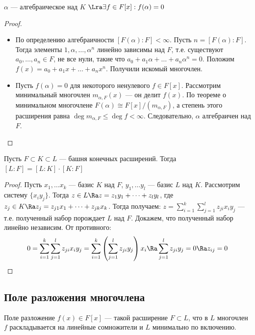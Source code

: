 
\begin{corollary}
    \(\alpha\) --- алгебраическое над \(K\) \(\Lra \exists f \in F[x]: f(\alpha) = 0\)
\end{corollary}
\begin{proof}
    \begin{itemize}
        \item[\(\Ra\)] По определению алгебраичности \([F(\alpha):F] < \infty\). Пусть \(n = [F(\alpha):F]\). Тогда элементы \(1, \alpha, \dots, \alpha^n\) линейно зависимы над \(F\), т.е. существуют \(a_0, \dots, a_n \in F\), не все нули, такие что \(a_0 + a_1\alpha + \dots + a_n\alpha^n = 0\). Положим \(f(x) = a_0 + a_1x + \dots + a_nx^n\). Получили искомый многочлен.
        \item[\(\La\)] Пусть \(f(\alpha) = 0\) для некоторого ненулевого \(f \in F[x]\). Рассмотрим минимальный многочлен \(m_{\alpha,F}(x)\) --- он делит \(f(x)\). По теореме о минимальном многочлене \(F(\alpha) \cong F[x]/(m_{\alpha,F})\), а степень этого расширения равна \(\deg m_{\alpha,F} \le \deg f < \infty\). Следовательно, \(\alpha\) алгебраичен над \(F\).
    \end{itemize}
\end{proof}

\begin{proposition}
    Пусть \(F \subset K \subset L\) --- башня конечных расширений. Тогда \([L:F] = [L:K] \cdot [K:F]\)
\end{proposition}
\begin{proof}
    Пусть \(x_1, \dots x_k\) --- базис \(K\) над \(F\), \(y_1, \dots y_l\) --- базис \(L\) над \(K\). Рассмотрим систему \(\{x_iy_j\}\). Тогда \(z \in L \Ra z = z_1y_1 + \dots + z_ly_l\), где \(z_j \in K \Ra z_j = z_{j1}x_1 + \dots + z_{jk}x_k\). Тогда получаем: \(z = \sum_{i = 1}^k\sum_{j = 1}^l z_{ji}x_iy_j\) --- т.е. полученный набор порождает \(L\) над \(F\). Докажем, что полученный набор линейно независим. От противного:
    \[0 = \sum_{i = 1}^k\sum_{j = 1}^l z_{ji}x_iy_j =  \sum_{i = 1}^k\left( \sum_{j = 1}^l z_{ji}y_j \right)x_i \Ra \sum_{j = 1}^l z_{ji}y_j = 0 \Ra z_{ij} = 0\]
\end{proof}

\subsection{Поле разложения многочлена}

\begin{definition}
    Поле разложение \(f(x) \in F[x]\) --- такой расширение \(F \subset L\), что в \(L\) многочлен \(f\) раскладывается на линейные сомножители и \(L\) минимально по включению.
\end{definition}

